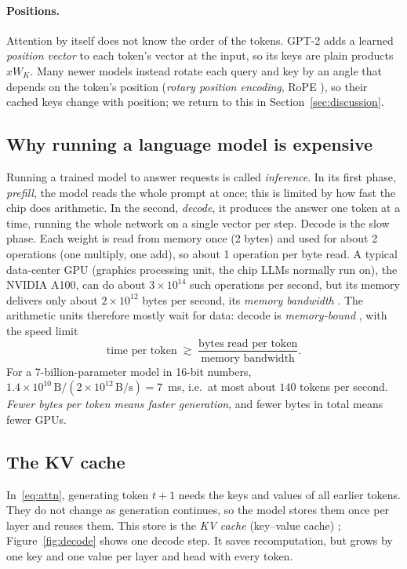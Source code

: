 \documentclass[10pt]{article}
\theoremstyle{plain}
\theoremstyle{definition}
\theoremstyle{remark}
\begin{document}
\paragraph{Positions.}
Attention by itself does not know the order of the tokens. GPT-2 adds a learned \emph{position vector} to each token's vector at the input, so its keys are plain products $xW_K$. Many newer models instead rotate each query and key by an angle that depends on the token's position (\emph{rotary position encoding}, RoPE \cite{su2024rope}), so their cached keys change with position; we return to this in Section~\ref{sec:discussion}.

\subsection{Why running a language model is expensive}
\label{sec:cost}

Running a trained model to answer requests is called \emph{inference}. In its first phase, \emph{prefill}, the model reads the whole prompt at once; this is limited by how fast the chip does arithmetic. In the second, \emph{decode}, it produces the answer one token at a time, running the whole network on a single vector per step. Decode is the slow phase. Each weight is read from memory once (2 bytes) and used for about 2 operations (one multiply, one add), so about 1 operation per byte read. A typical data-center GPU (graphics processing unit, the chip LLMs normally run on), the NVIDIA A100, can do about $3\times10^{14}$ such operations per second, but its memory delivers only about $2\times10^{12}$ bytes per second, its \emph{memory bandwidth} \cite{nvidia2020}. The arithmetic units therefore mostly wait for data: decode is \emph{memory-bound} \cite{pope2023}, with the speed limit
\begin{equation}\label{eq:speed}
\text{time per token}\;\gtrsim\;\frac{\text{bytes read per token}}{\text{memory bandwidth}}.
\end{equation}
For a 7-billion-parameter model in 16-bit numbers, $1.4\times10^{10}\,\text{B}/(2\times10^{12}\,\text{B/s})=7$~ms, i.e.\ at most about $140$ tokens per second. \emph{Fewer bytes per token means faster generation}, and fewer bytes in total means fewer GPUs.

\subsection{The KV cache}
\label{sec:kvcache}

In~\eqref{eq:attn}, generating token $t+1$ needs the keys and values of all earlier tokens. They do not change as generation continues, so the model stores them once per layer and reuses them. This store is the \emph{KV cache} (key--value cache) \cite{pope2023}; Figure~\ref{fig:decode} shows one decode step. It saves recomputation, but grows by one key and one value per layer and head with every token.
\end{document}
